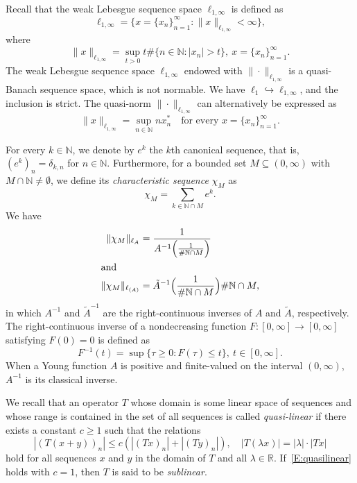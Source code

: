 \documentclass[nointlimits]{amsart}
\numberwithin{equation}{section}
\theoremstyle{plain}
\theoremstyle{definition}
\newcommand{\R}{\mathbb{R}}
\newcommand{\N}{\mathbb{N}}
\newcommand{\tA}{\tilde{A}}
\newcommand{\lA}{\ell_A}
\newcommand{\lAOrl}{\ell_{(A)}}
\begin{document}
Recall that the weak Lebesgue sequence space $\ell_{1,\infty}$ is defined as
\begin{equation*}
    \ell_{1, \infty} = \{ x = \{x_n\}_{n  = 1}^\infty: \|x\|_{\ell_{1, \infty}} < \infty\},
\end{equation*}
where
\begin{equation*}
    \|x\|_{\ell_{1, \infty}} = \sup_{t>0} t \#\{n\in\N: |x_n| > t\},\ x = \{x_n\}_{n  = 1}^\infty.
\end{equation*}
The weak Lebesgue sequence space $\ell_{1,\infty}$ endowed with $\|\cdot\|_{\ell_{1, \infty}}$ is a quasi-Banach sequence space, which is not normable. 
We have $\ell_1 \hookrightarrow \ell_{1, \infty}$, and the inclusion is strict. The quasi-norm $\|\cdot\|_{\ell_{1, \infty}}$ can alternatively be expressed as
\begin{equation}\label{E:weak_l1_in_terms_of_rearrangement}
    \|x\|_{\ell_{1, \infty}} = \sup_{n\in\N} n x^*_n \quad \text{for every $x = \{x_n\}_{n  = 1}^\infty$}.
\end{equation}

For every $k\in\N$, we denote by $e^k$ the $k$th canonical sequence, that is, $(e^k)_n = \delta_{k,n}$ for $n\in\N$. Furthermore, for a bounded set $M\subseteq(0,\infty)$ with $M\cap \N\neq \emptyset$, we define its \emph{characteristic sequence} $\chi_M$ as
\begin{equation*}
    \chi_M = \sum_{k\in\N\cap M} e^k.
\end{equation*}
We have
\begin{align}
    \|\chi_M\|_{\lA} &= \frac1{A^{-1}\Big( \frac1{\# \N\cap M} \Big)} \nonumber\\
    \intertext{and}
    \|\chi_M\|_{\lAOrl} &= \tA^{-1}\Big( \frac1{\# \N\cap M} \Big)\# \N\cap M, \label{prel:Orlicz_norm_char_seq}
\end{align}
in which $A^{-1}$ and $\tA^{-1}$ are the right-continuous inverses of $A$ and $\tA$, respectively. The right-continuous inverse of a nondecreasing function $F\colon[0,\infty] \to [0,\infty]$ satisfying $F(0) = 0$ is defined as
\begin{equation*}
    F^{-1}(t) = \sup\{\tau \geq 0: F(\tau) \leq t\},\ t\in[0, \infty].
\end{equation*}
When a Young function $A$ is positive and finite-valued on the interval $(0, \infty)$, $A^{-1}$ is its classical inverse.

We recall that an operator $T$  whose domain is some linear space of sequences and whose range is contained in the set of all sequences is called \emph{quasi-linear} if there exists a constant $c\ge1$ such that the relations
    \begin{equation}
        \label{E:quasilinear}
        |(T(x+y))_n|
        \le c
        \left(
        |(Tx)_n|
        +
        |(Ty)_n|
        \right),
        \quad
        |T(\lambda x)|=|\lambda|\cdot|Tx|
    \end{equation}    
hold for all sequences $x$ and $y$ in the domain of $T$ and all $\lambda\in\R$. If~\eqref{E:quasilinear} holds with $c=1$, then $T$ is said to be \emph{sublinear}.
\end{document}
